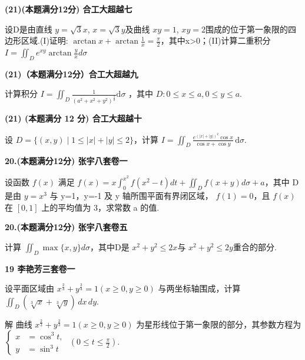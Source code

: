 \documentclass[a4paper,12pt]{article}
\begin{document}
\textbf{(21)(本题满分12分) 合工大超越七}

设D是由直线 $y=\sqrt{3}x$, $x=\sqrt{3}y$及曲线 $xy=1$, $xy=2$围成的位于第一象限的四边形区域.(I)证明: $\arctan x+\arctan\frac{1}{x}=\frac{\pi}{2}$，其中x>0；(II)计算二重积分 $I=\iint_{D}e^{xy}\arctan\frac{y}{x}d\sigma$

\vspace{0.5cm}

\textbf{(21)（本题满分12分）合工大超越九}

计算积分 $I=\iint_{D}\frac{1}{\left(a^{2}+x^{2}+y^{2}\right)^{\frac{3}{2}}}\mathrm{d}\sigma$ ，其中 $D:0\leqslant x\leqslant a,0\leqslant y\leqslant a.$

\vspace{0.5cm}

\textbf{(21) (本题满分 12 分) 合工大超越十}

设 $D = \{(x, y) \mid 1 \leqslant |x| + |y| \leqslant 2\}$，计算 $I = \iint_{D} \frac{e^{(|x| + |y|)^2} \cos x}{\cos x + \cos y} \, \mathrm{d}\sigma.$

\vspace{0.5cm}

\textbf{20.(本题满分12分) 张宇八套卷一}

设函数 $f(x)$ 满足 $f(x)=x\int_{0}^{x^{2}}f(x^{2}-t)dt+\iint_{D}f(x+y)d\sigma+a$，其中 D 是由 $y=x^{3}$ 与 y=1，y=-1 及 y 轴所围平面有界闭区域， $f(1)=0$，且 $f(x)$ 在 $[0,1]$ 上的平均值为 3，求常数 a 的值.

\vspace{0.5cm}

\textbf{20.(本题满分12分) 张宇八套卷五}

计算 $\iint_{D}\max\{x,y\}d\sigma$，其中D是 $x^{2}+y^{2}\leqslant2x$与 $x^{2}+y^{2}\leqslant2y$重合的部分.

\vspace{0.5cm}

\textbf{19 李艳芳三套卷一}

设平面区域由 $x^{\frac{2}{3}} + y^{\frac{2}{3}} = 1 (x \geqslant 0, y \geqslant 0)$ 与两坐标轴围成，计算 $\iint_{D} (\sqrt[3]{x} + \sqrt[3]{y}) \, dx \, dy$.

解 曲线 $x^{\frac{2}{3}} + y^{\frac{2}{3}} = 1 (x \geqslant 0, y \geqslant 0)$ 为星形线位于第一象限的部分，其参数方程为 $\left\{\begin{aligned} x &= \cos^{3}t, \\ y &= \sin^{3}t \end{aligned}\right.$ $\left(0 \leqslant t \leqslant \frac{\pi}{2}\right)$.
\end{document}
